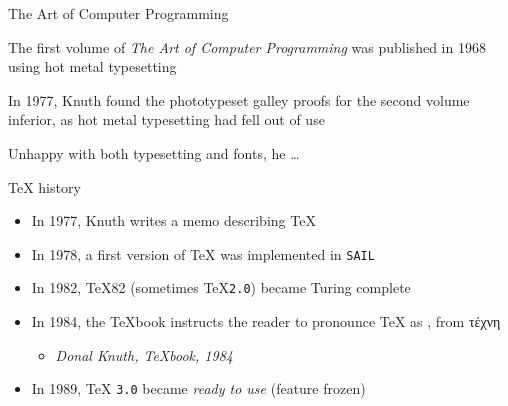 \documentclass[english]{beamer}
\let\olditem\item
\renewcommand{\item}{\setlength{\itemsep}{\fill}\olditem}
\newenvironment{sitemize}{\let\item\olditem \begin{itemize}}{\vfill\end{itemize}}
\let\textttt\texttt
\renewcommand{\texttt}[1]{\colorbox{gray!10}{\textttt{#1}}}
\begin{document}
\begin{frame}{The Art of Computer Programming}
    \begin{itemize}
        \item The first volume of \emph{The Art of Computer Programming} was published in 1968 using hot metal typesetting
         {
            \item In 1977, Knuth found the phototypeset galley proofs for the second volume inferior, as hot metal typesetting had fell out of use
            \item Unhappy with both typesetting and fonts, he \dots{}
        }
    \end{itemize}
\end{frame}

\begin{frame}{\TeX{} history}
    \begin{itemize}
        \item In 1977, Knuth writes a memo describing \TeX
        \item In 1978, a first version of \TeX{} was implemented in \texttt{SAIL}
        \item In 1982, \TeX{}82 (sometimes \TeX{}\texttt{2.0}) became Turing complete
        \item In 1984, the \TeX{}book instructs the reader to pronounce \TeX{} as , from τέχνη
        \begin{sitemize}
            \item {} \textit{Donal Knuth, \TeX{}book, 1984}
        \end{sitemize}
        \item In 1989, \TeX{} \texttt{3.0} became \emph{ready to use} (feature frozen)
    \end{itemize}
\end{frame}
\end{document}

